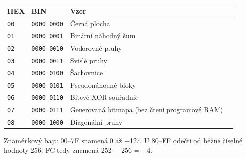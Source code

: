 \documentclass[11pt,a4paper]{article}
\newcommand{\sub}[1]{\par\vspace{2mm}{\sffamily\bfseries\large #1\par}\nobreak}
\begin{document}
\sub{Argument PATTERN}
{\small\begin{tabularx}{\linewidth}{@{}lllX@{}}\toprule
\textbf{HEX} & \textbf{BIN} & \textbf{Vzor} & \textbf{}\\\midrule
\texttt{00} & \texttt{0000 0000} & Černá plocha & \\
\texttt{01} & \texttt{0000 0001} & Binární náhodný šum & \\
\texttt{02} & \texttt{0000 0010} & Vodorovné pruhy & \\
\texttt{03} & \texttt{0000 0011} & Svislé pruhy & \\
\texttt{04} & \texttt{0000 0100} & Šachovnice & \\
\texttt{05} & \texttt{0000 0101} & Pseudonáhodné bloky & \\
\texttt{06} & \texttt{0000 0110} & Bitové XOR souřadnic & \\
\texttt{07} & \texttt{0000 0111} & Generovaná bitmapa (bez čtení programové RAM) & \\
\texttt{08} & \texttt{0000 1000} & Diagonální pruhy & \\
\bottomrule\end{tabularx}}\par
Znaménkový bajt: 00--7F znamená 0 až +127. U 80--FF odečti od běžné číselné hodnoty 256. FC tedy znamená 252 \ensuremath{-} 256 = \ensuremath{-}4.
\end{document}
